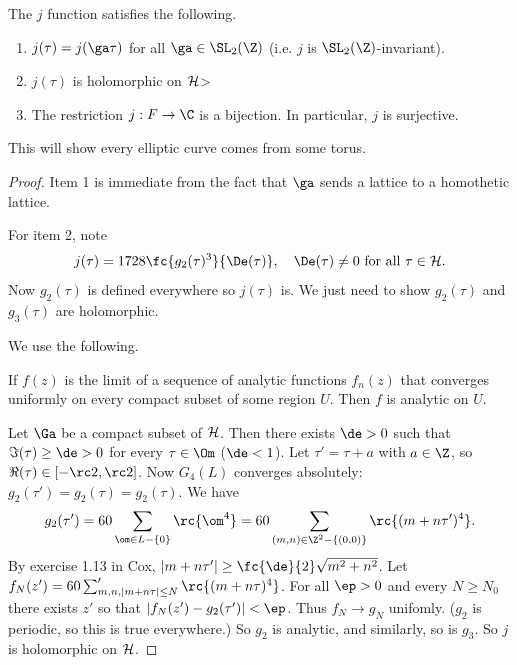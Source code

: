 \begin{thm}
The $j$ function satisfies the following.
\begin{enumerate}
\item
$j(\tau)=j(\ga\tau)$ for all $\ga\in \SL_2(\Z)$ (i.e. $j$ is $\SL_2(\Z)$-invariant).
\item
$j(\tau)$ is holomorphic on $\cal H$>
\item
The restriction $j:F\to \C$ is a bijection. In particular, $j$ is surjective.
\end{enumerate}
\end{thm}
This will show every elliptic curve comes from some torus.
\begin{proof}
Item 1 is immediate from the fact that $\ga$ sends a lattice to a homothetic lattice.

For item 2, note
\[
j(\tau)=1728\fc{g_2(\tau)^3}{\De(\tau)},\quad \De(\tau)\ne 0\text{ for all }\tau\in \cal H.
\]
Now $g_2(\tau)$ is defined everywhere so $j(\tau)$ is. We just need to show $g_2(\tau)$ and $g_3(\tau)$ are holomorphic.

We use the following.
\begin{thm}
If $f(z)$ is the limit of a sequence of analytic functions $f_n(z)$ that converges uniformly on every compact subset of some region $U$. Then $f$ is analytic on $U$.
\end{thm}
Let $\Ga$ be a compact subset of $\cal H$. Then there exists $\de>0$ such that $\Im(\tau)\ge \de>0$ for every $\tau\in \Om$ ($\de<1$). Let $\tau'=\tau+a$ with $a\in \Z$, so $\Re(\tau)\in [-\rc 2,\rc 2]$. Now $G_4(L)$ converges absolutely: $g_2(\tau')=g_2(\tau)=g_2(\tau)$. We have
\[
g_2(\tau')=60\sum_{\om\in L-\{0\}} \rc{\om^4}=60\sum_{(m,n)\in \Z^2-\{(0,0)\}} \rc{(m+n\tau')^4}.
\]
By exercise 1.13 in Cox, $|m+n\tau'|\ge \fc{\de}{2}\sqrt{m^2+n^2}$. %
Let $f_N(z')=60 \sum_{m,n,|m+n\tau|\le N}'\rc{(m+n\tau)^4}$. For all $\ep>0$ and every $N\ge N_0$ there exists $z'$ so that $|f_N(z')-g_2(\tau')|<\ep$. Thus $f_N\to g_N$ unifomly. ($g_2$ is periodic, so this is true everywhere.) So $g_2$ is analytic, and similarly, so is $g_3$. So $j$ is holomorphic on $\cal H$.


\end{proof}
